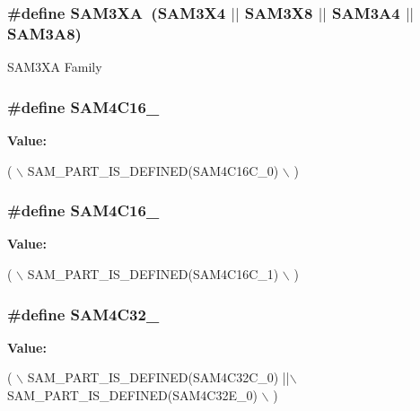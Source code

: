 \subsubsection[{S\+A\+M3\+X\+A}]{\setlength{\rightskip}{0pt plus 5cm}\#define S\+A\+M3\+X\+A~(S\+A\+M3\+X4 $\vert$$\vert$ S\+A\+M3\+X8 $\vert$$\vert$ S\+A\+M3\+A4 $\vert$$\vert$ S\+A\+M3\+A8)}\label{group__sam__part__macros__group_gaae4990dfaa4eeed17d8a0351cca02fdd}
S\+A\+M3\+X\+A Family \hypertarget{group__sam__part__macros__group_ga933b4554835e5159623415812db1400e}{}
\subsubsection[{S\+A\+M4\+C16\+\_\+0}]{\setlength{\rightskip}{0pt plus 5cm}\#define S\+A\+M4\+C16\+\_}\label{group__sam__part__macros__group_ga933b4554835e5159623415812db1400e}
{\bfseries Value\+:}
\begin{DoxyCode}
( \(\backslash\)
        SAM\_PART\_IS\_DEFINED(SAM4C16C\_0) \(\backslash\)
        )
\end{DoxyCode}
\hypertarget{group__sam__part__macros__group_ga9240bd8927b6ae5e76e4f60cbe18be4b}{}
\subsubsection[{S\+A\+M4\+C16\+\_\+1}]{\setlength{\rightskip}{0pt plus 5cm}\#define S\+A\+M4\+C16\+\_}\label{group__sam__part__macros__group_ga9240bd8927b6ae5e76e4f60cbe18be4b}
{\bfseries Value\+:}
\begin{DoxyCode}
( \(\backslash\)
        SAM\_PART\_IS\_DEFINED(SAM4C16C\_1) \(\backslash\)
        )
\end{DoxyCode}
\hypertarget{group__sam__part__macros__group_ga80a3a5850f6f7ac1b16a781c63e46c67}{}
\subsubsection[{S\+A\+M4\+C32\+\_\+0}]{\setlength{\rightskip}{0pt plus 5cm}\#define S\+A\+M4\+C32\+\_}\label{group__sam__part__macros__group_ga80a3a5850f6f7ac1b16a781c63e46c67}
{\bfseries Value\+:}
\begin{DoxyCode}
( \(\backslash\)
        SAM\_PART\_IS\_DEFINED(SAM4C32C\_0) ||\(\backslash\)
        SAM\_PART\_IS\_DEFINED(SAM4C32E\_0) \(\backslash\)
        )
\end{DoxyCode}
\hypertarget{group__sam__part__macros__group_ga84c94a3f93f7d2a0c440607a263477b7}{}
